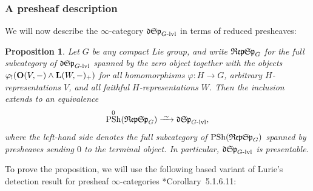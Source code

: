 \documentclass[reqno]{memo-l}
\theoremstyle{mythm}
\newtheorem{prop}[thm]{Proposition}
\theoremstyle{definition}
\numberwithin{equation}{section}
\renewcommand{\phi}{\varphi}
\DeclareMathOperator{\PSh}{PSh}
\newcommand{\cat}[1]{\textbf{\textup{#1}}}
\let\smashp=\wedge
\newcommand{\iso}{\xrightarrow{\;\smash{\raisebox{-0.25ex}{\ensuremath{\scriptstyle\sim}}}\;}}
\newcommand{\mySp}{{\mathfrak S\kern-.5pt\mathfrak p}}
\newcommand{\myLSp}{{\mathfrak d\kern-.25pt}\mySp}
\newcommand{\mySph}{{\mathfrak R\kern-.5pt\mathfrak e\kern-.5pt\mathfrak p\kern-.5pt\mathfrak S\kern-.5pt\mathfrak p}}
\begin{document}
\subsubsection{A presheaf description} We will now describe the $\infty$-category $\myLSp_\textup{$G$-lvl}$ in terms of reduced presheaves:

\begin{prop}\label{prop:mySplev-unpar-presh}
    Let $G$ be any compact Lie group, and write $\mySph_G$ for the full subcategory of $\myLSp_\textup{$G$-lvl}$ spanned by the zero object together with the objects $\phi_!(\cat{O}(V,-)\smashp\cat{L}(W,-)_+)$ for all homomorphisms $\phi\colon H\to G$, arbitrary $H$-representations $V$, and all faithful $H$-representations $W$. Then the inclusion extends to an equivalence \[\PSh^0(\mySph_G)\iso\myLSp_\textup{$G$-lvl},\] where the left-hand side denotes the full subcategory of $\PSh(\mySph_G)$ spanned by presheaves sending $0$ to the terminal object. In particular, $\myLSp_\textup{$G$-lvl}$ is presentable.
\end{prop}

To prove the proposition, we will use the following based variant of Lurie's detection result for presheaf $\infty$-categories \cite{HTT}*{Corollary~5.1.6.11}:
\end{document}
